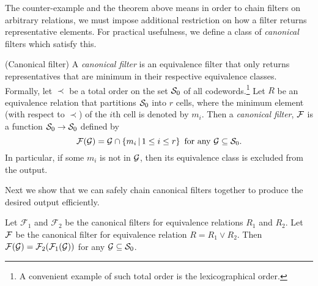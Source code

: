 
The counter-example and the theorem above means in order to chain filters on arbitrary relations, we must impose additional restriction on how a filter returns representative elements. For practical usefulness, we define a class of \emph{canonical} filters which satisfy this.

\begin{definition}
(Canonical filter) A \emph{canonical filter} is an equivalence filter that only returns representatives that are minimum in their respective equivalence classes. Formally, let $\prec$ be a total order on the set $\mathcal{S}_0$ of all codewords.\footnote{A convenient example of such total order is the lexicographical order.}
Let $R$ be an equivalence relation that partitions $\mathcal{S}_0$ into $r$ cells, where the minimum element (with respect to $\prec$) of the $i$th cell is denoted by $m_i$. Then a \emph{canonical filter}, $\mathcal{F}$ is a function $\mathcal{S}_0 \rightarrow \mathcal{S}_0$ defined by
\begin{equation}
\mathcal{F}(\mathcal{G}) = \mathcal{G} \cap \left\{ m_i \,|\, 1 \le i \le r \right\} \text{ for any } \mathcal{G} \subseteq \mathcal{S}_0 . \label{eq:canonical-filter-1}
\end{equation}
In particular, if some $m_i$ is not in $\mathcal{G}$, then its equivalence class is excluded from the output.
\end{definition}

Next we show that we can safely chain canonical filters together to produce the desired output efficiently.

\begin{theorem}
Let $\mathcal{F}_1$ and $\mathcal{F}_2$ be the canonical filters for equivalence relations $R_1$ and $R_2$. Let $\mathcal{F}$ be the canonical filter for equivalence relation $R = R_1 \vee R_2$. Then $\mathcal{F}(\mathcal{G}) = \mathcal{F}_2(\mathcal{F}_1(\mathcal{G}))$ for any $\mathcal{G} \subseteq \mathcal{S}_0$.
\end{theorem}

